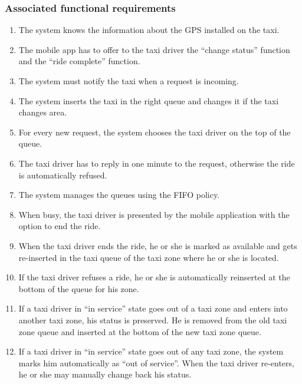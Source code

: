 \subsubsection{Associated functional requirements}
\begin{enumerate}
\item The system knows the information about the GPS installed on the taxi.
\item The mobile app has to offer to the taxi driver the ``change status'' function and the ``ride complete'' function.
\item The system must notify the taxi when a request is incoming.
\item The system inserts the taxi in the right queue and changes it if the taxi changes area.
\item For every new request, the system chooses the taxi driver on the top of the queue.
\item The taxi driver has to reply in one minute to the request, otherwise the ride is automatically refused.
\item The system manages the queues using the FIFO policy.
\item When busy, the taxi driver is presented by the mobile application with the option to end the ride.
\item When the taxi driver ends the ride, he or she is marked as available and gets re-inserted in the taxi queue of the taxi zone where he or she is located.
\item If the taxi driver refuses a ride, he or she is automatically reinserted at the bottom of the queue for his zone.
\item If a taxi driver in ``in service'' state goes out of a taxi zone and enters into another taxi zone, his status is preserved. He is removed from the old taxi zone queue and inserted at the bottom of the new taxi zone queue.
\item If a taxi driver in ``in service'' state goes out of any taxi zone, the system marks him automatically as ``out of service''. When the taxi driver re-enters, he or she may manually change back his status.
\end{enumerate}
